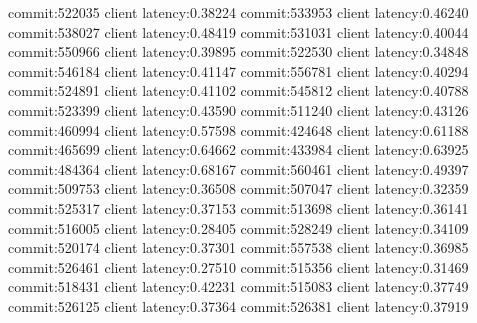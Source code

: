 commit:522035 client latency:0.38224
commit:533953 client latency:0.46240
commit:538027 client latency:0.48419
commit:531031 client latency:0.40044
commit:550966 client latency:0.39895
commit:522530 client latency:0.34848
commit:546184 client latency:0.41147
commit:556781 client latency:0.40294
commit:524891 client latency:0.41102
commit:545812 client latency:0.40788
commit:523399 client latency:0.43590
commit:511240 client latency:0.43126
commit:460994 client latency:0.57598
commit:424648 client latency:0.61188
commit:465699 client latency:0.64662
commit:433984 client latency:0.63925
commit:484364 client latency:0.68167
commit:560461 client latency:0.49397
commit:509753 client latency:0.36508
commit:507047 client latency:0.32359
commit:525317 client latency:0.37153
commit:513698 client latency:0.36141
commit:516005 client latency:0.28405
commit:528249 client latency:0.34109
commit:520174 client latency:0.37301
commit:557538 client latency:0.36985
commit:526461 client latency:0.27510
commit:515356 client latency:0.31469
commit:518431 client latency:0.42231
commit:515083 client latency:0.37749
commit:526125 client latency:0.37364
commit:526381 client latency:0.37919